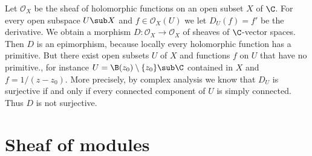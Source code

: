 \begin{example}\label{sheaf cat epi not surjective on object}
Let $\mathscr{O}_X$ be the sheaf of holomorphic functions on an open subset $X$ of $\C$. For every open subspace $U\sub X$ and $f\in\mathscr{O}_X(U)$ we let $D_U(f)=f'$ be the derivative. We obtain a morphism $D:\mathscr{O}_X\to\mathscr{O}_X$ of sheaves of $\C$-vector spaces. Then $D$ is an epimorphism, because locally every holomorphic function has a primitive. But there exist open subsets $U$ of $X$ and functions $f$ on $U$ that have no primitive., for instance $U=\B(z_0)\setminus\{z_0\}\sub\C$ contained in $X$ and $f=1/(z-z_0)$. More precisely, by complex analysis we know that $D_U$ is surjective if and only if every connected component of $U$ is simply connected. Thus $D$ is not surjective.
\end{example}
\section{Sheaf of modules}

